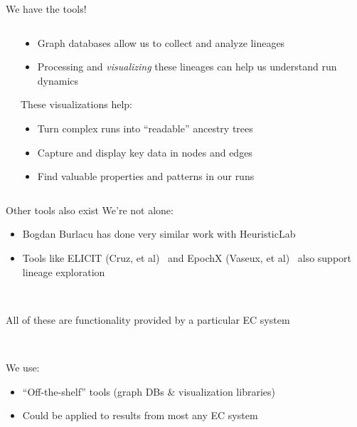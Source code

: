 \documentclass{beamer}
\begin{document}
\begin{frame}{We have the tools!}
\begin{columns}
\begin{column}{0.5\textwidth}
\end{column}
\begin{column}{0.5\textwidth}
\begin{overprint}
\begin{itemize}
    \item Graph databases allow us to collect and analyze lineages
    \item Processing and \emph{visualizing} these lineages can help us understand run dynamics
\end{itemize}
These visualizations help:
\begin{itemize}
	\item Turn complex runs into ``readable'' ancestry trees
    \item Capture and display key data in nodes and edges
    \item Find valuable properties and patterns in our runs
\end{itemize}
\end{overprint}
\end{column}
\end{columns}
\end{frame}

\begin{frame}{Other tools also exist}
We're not alone:
\begin{itemize}
	\item Bogdan Burlacu has done very similar work with HeuristicLab~\cite{Burlacu:2013:GECCOcomp:new, Burlacu:CIEES:2015}
    \item Tools like ELICIT (Cruz, et al)~\cite{cruz2015elicit} and EpochX (Vaseux, et al)~\cite{vaseux2013event} also support lineage exploration
\end{itemize}

~

All of these are functionality provided by a particular EC system

~

We use:
\begin{itemize}
	\item ``Off-the-shelf'' tools (graph DBs \& visualization libraries)
    \item Could be applied to results from most any EC system
\end{itemize}
\end{frame}
\end{document}
